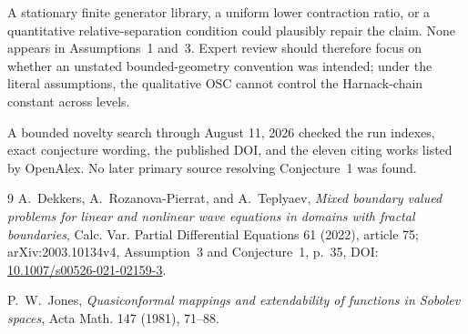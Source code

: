 \documentclass[11pt]{article}
\begin{document}
A stationary finite generator library, a uniform lower contraction ratio, or
a quantitative relative-separation condition could plausibly repair the
claim.  None appears in Assumptions~1 and~3.  Expert review should therefore
focus on whether an unstated bounded-geometry convention was intended; under
the literal assumptions, the qualitative OSC cannot control the Harnack-chain
constant across levels.

A bounded novelty search through August 11, 2026 checked the run indexes,
exact conjecture wording, the published DOI, and the eleven citing works
listed by OpenAlex.  No later primary source resolving Conjecture~1 was found.

\begin{thebibliography}{9}
A.~Dekkers, A.~Rozanova-Pierrat, and A.~Teplyaev,
\emph{Mixed boundary valued problems for linear and nonlinear wave equations
in domains with fractal boundaries},
Calc. Var. Partial Differential Equations 61 (2022), article 75;
arXiv:2003.10134v4, Assumption~3 and Conjecture~1, p.~35,
DOI: \href{https://doi.org/10.1007/s00526-021-02159-3}
{10.1007/s00526-021-02159-3}.

P.~W.~Jones,
\emph{Quasiconformal mappings and extendability of functions in Sobolev
spaces}, Acta Math. 147 (1981), 71--88.
\end{thebibliography}
\end{document}
